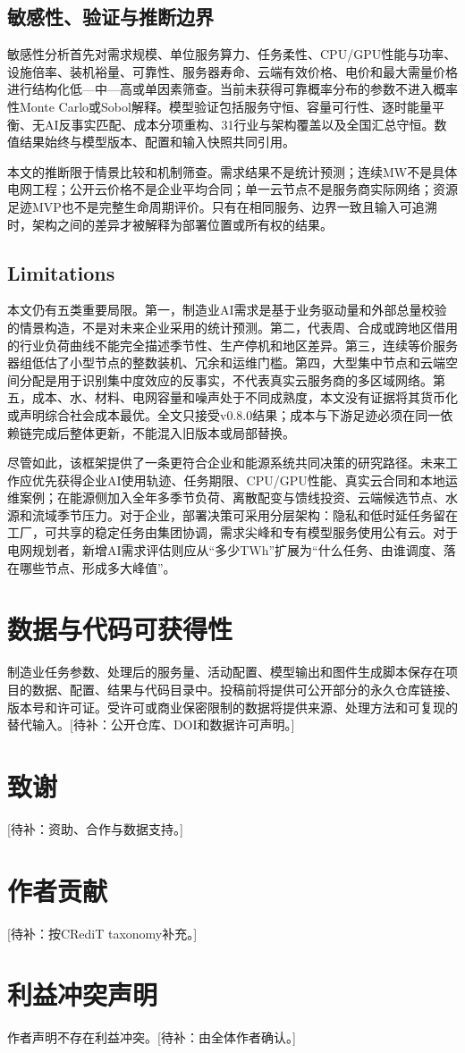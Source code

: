 \documentclass[preprint,12pt]{elsarticle}
\newcommand{\tbd}[1]{\textcolor{red!70!black}{[待补：#1]}}
\begin{document}
\subsection*{敏感性、验证与推断边界}

敏感性分析首先对需求规模、单位服务算力、任务柔性、CPU/GPU性能与功率、设施倍率、装机裕量、可靠性、服务器寿命、云端有效价格、电价和最大需量价格进行结构化低---中---高或单因素筛查。当前未获得可靠概率分布的参数不进入概率性Monte Carlo或Sobol解释。模型验证包括服务守恒、容量可行性、逐时能量平衡、无AI反事实匹配、成本分项重构、31行业与架构覆盖以及全国汇总守恒。数值结果始终与模型版本、配置和输入快照共同引用。

本文的推断限于情景比较和机制筛查。需求结果不是统计预测；连续MW不是具体电网工程；公开云价格不是企业平均合同；单一云节点不是服务商实际网络；资源足迹MVP也不是完整生命周期评价。只有在相同服务、边界一致且输入可追溯时，架构之间的差异才被解释为部署位置或所有权的结果。

\subsection*{Limitations}

本文仍有五类重要局限。第一，制造业AI需求是基于业务驱动量和外部总量校验的情景构造，不是对未来企业采用的统计预测。第二，代表周、合成或跨地区借用的行业负荷曲线不能完全描述季节性、生产停机和地区差异。第三，连续等价服务器组低估了小型节点的整数装机、冗余和运维门槛。第四，大型集中节点和云端空间分配是用于识别集中度效应的反事实，不代表真实云服务商的多区域网络。第五，成本、水、材料、电网容量和噪声处于不同成熟度，本文没有证据将其货币化或声明综合社会成本最优。全文只接受v0.8.0结果；成本与下游足迹必须在同一依赖链完成后整体更新，不能混入旧版本或局部替换。

尽管如此，该框架提供了一条更符合企业和能源系统共同决策的研究路径。未来工作应优先获得企业AI使用轨迹、任务期限、CPU/GPU性能、真实云合同和本地运维案例；在能源侧加入全年多季节负荷、离散配变与馈线投资、云端候选节点、水源和流域季节压力。对于企业，部署决策可采用分层架构：隐私和低时延任务留在工厂，可共享的稳定任务由集团协调，需求尖峰和专有模型服务使用公有云。对于电网规划者，新增AI需求评估则应从“多少TWh”扩展为“什么任务、由谁调度、落在哪些节点、形成多大峰值”。

\section*{数据与代码可获得性}

制造业任务参数、处理后的服务量、活动配置、模型输出和图件生成脚本保存在项目的数据、配置、结果与代码目录中。投稿前将提供可公开部分的永久仓库链接、版本号和许可证。受许可或商业保密限制的数据将提供来源、处理方法和可复现的替代输入。\tbd{公开仓库、DOI和数据许可声明。}

\section*{致谢}
\tbd{资助、合作与数据支持。}

\section*{作者贡献}
\tbd{按CRediT taxonomy补充。}

\section*{利益冲突声明}
作者声明不存在利益冲突。\tbd{由全体作者确认。}



\end{document}

